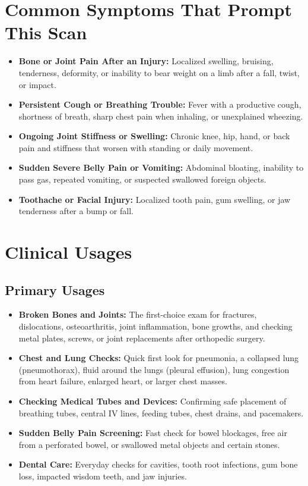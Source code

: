 \section{Common Symptoms That Prompt This Scan}
\begin{itemize}
    \item \textbf{Bone or Joint Pain After an Injury:} Localized swelling, bruising, tenderness, deformity, or inability to bear weight on a limb after a fall, twist, or impact.
    \item \textbf{Persistent Cough or Breathing Trouble:} Fever with a productive cough, shortness of breath, sharp chest pain when inhaling, or unexplained wheezing.
    \item \textbf{Ongoing Joint Stiffness or Swelling:} Chronic knee, hip, hand, or back pain and stiffness that worsen with standing or daily movement.
    \item \textbf{Sudden Severe Belly Pain or Vomiting:} Abdominal bloating, inability to pass gas, repeated vomiting, or suspected swallowed foreign objects.
    \item \textbf{Toothache or Facial Injury:} Localized tooth pain, gum swelling, or jaw tenderness after a bump or fall.
\end{itemize}

\section{Clinical Usages}

\subsection{Primary Usages}

\begin{itemize}
    \item \textbf{Broken Bones and Joints:} The first-choice exam for fractures, dislocations, osteoarthritis, joint inflammation, bone growths, and checking metal plates, screws, or joint replacements after orthopedic surgery.
    \item \textbf{Chest and Lung Checks:} Quick first look for pneumonia, a collapsed lung (pneumothorax), fluid around the lungs (pleural effusion), lung congestion from heart failure, enlarged heart, or larger chest masses.
    \item \textbf{Checking Medical Tubes and Devices:} Confirming safe placement of breathing tubes, central IV lines, feeding tubes, chest drains, and pacemakers.
    \item \textbf{Sudden Belly Pain Screening:} Fast check for bowel blockages, free air from a perforated bowel, or swallowed metal objects and certain stones.
    \item \textbf{Dental Care:} Everyday checks for cavities, tooth root infections, gum bone loss, impacted wisdom teeth, and jaw injuries.
\end{itemize}

